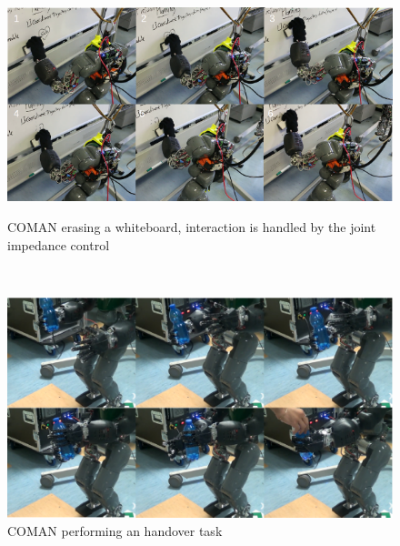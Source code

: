 \begin{figure}
\centering
\begin{minipage}[b]{7.7cm}
        \centering
        \includegraphics[width=1.0\textwidth]{images/soft_interaction/sot_bb.png}
        \caption{COMAN erasing a whiteboard, interaction is handled by the joint impedance control}
        \label{COMAN_bb}
\end{minipage}
 \ \hspace{3mm} \
\begin{minipage}[b]{7.7cm}
        \centering
        \includegraphics[width=1.0\textwidth]{images/soft_interaction/handover.eps}
        \caption{COMAN performing an handover task}
        \label{COMAN_handover}
\end{minipage}
\end{figure}

